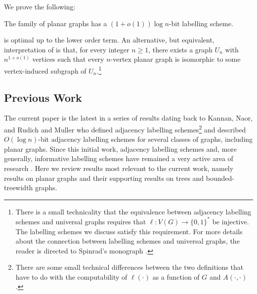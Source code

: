 \documentclass[kpfonts]{patmorin}
\let\ge\geqslant
\begin{document}
We prove the following:
\begin{thm}
  The family of planar graphs has a $(1+o(1))\log n$-bit labelling scheme.
\end{thm}


 is optimal up to the lower order term.  An alternative, but equivalent, interpretation of  is that, for every integer $n\ge 1$, there exists a graph $U_n$ with $n^{1+o(1)}$  vertices such that every $n$-vertex planar graph is isomorphic to some vertex-induced subgraph of $U_n$.\footnote{There is a small technicality that the equivalence between adjacency labelling schemes and universal graphs requires that $\ell:V(G)\to\{0,1\}^*$ be injective.  The labelling schemes we discuss satisfy this requirement.  For more details about the connection between labelling schemes and universal graphs, the reader is directed to Spinrad's monograph \cite[Section~2.1]{spinrad:efficient}.} 

\subsection{Previous Work}

The current paper is the latest in a series of results dating back to Kannan, Naor, and Rudich \cite{kannan.naor.ea:implicit0,kannan.naor.ea:implicit} and Muller \cite{muller:local} who defined adjacency labelling schemes\footnote{There are some small technical differences between the two definitions that have to do with the computability of $\ell(\cdot)$ as a function of $G$ and
$A(\cdot,\cdot)$.} and described $O(\log n)$-bit adjacency labelling schemes for several classes of graphs, including planar graphs.  Since this initial work, adjacency labelling schemes and, more generally, informative labelling schemes have remained a very active area of research \cite{adjiashvili.rotbart:labeling,alstrup.kaplan.ea:adjacency,abrahamsen.alstrup.ea:near-optimal,alstrup.dahlgaard.ea:sublinear,alstrup.gortz.ea:distance,alstrup.gavoille.ea:simpler,alstrup.rauhe:improved}. Here we review results most relevant to the current work, namely results on planar graphs and their supporting results on trees and bounded-treewidth graphs.
\end{document}
